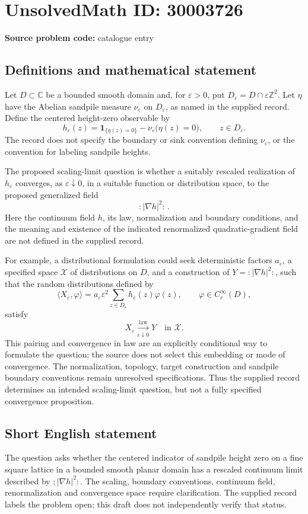 \documentclass[11pt]{article}
\newcommand{\Z}{\mathbb{Z}}
\newcommand{\C}{\mathbb{C}}
\begin{document}
\section*{UnsolvedMath ID: 30003726}
\textbf{Source problem code:} catalogue entry
\subsection{Definitions and mathematical statement}
Let \(D\subset\C\) be a bounded smooth domain and, for \(\varepsilon>0\), put \(D_\varepsilon=D\cap\varepsilon\Z^2\). Let \(\eta\) have the Abelian sandpile measure \(\nu_\varepsilon\) on \(D_\varepsilon\), as named in the supplied record. Define the centered height-zero observable by
\[
h_\varepsilon(z)=\mathbf{1}_{\{\eta(z)=0\}}-\nu_\varepsilon\bigl(\eta(z)=0\bigr),\qquad z\in D_\varepsilon.
\]
The record does not specify the boundary or sink convention defining \(\nu_\varepsilon\), or the convention for labeling sandpile heights.

The proposed scaling-limit question is whether a suitably rescaled realization of \(h_\varepsilon\) converges, as \(\varepsilon\downarrow0\), in a suitable function or distribution space, to the proposed generalized field
\[
:\!|\nabla h|^2\!:\,.
\]
Here the continuum field \(h\), its law, normalization and boundary conditions, and the meaning and existence of the indicated renormalized quadratic-gradient field are not defined in the supplied record.

For example, a distributional formulation could seek deterministic factors \(a_\varepsilon\), a specified space \(\mathcal X\) of distributions on \(D\), and a construction of \(Y=:\!|\nabla h|^2\!:\), such that the random distributions defined by
\[
\langle X_\varepsilon,\varphi\rangle
=a_\varepsilon\varepsilon^2\sum_{z\in D_\varepsilon}h_\varepsilon(z)\varphi(z),
\qquad \varphi\in C_c^\infty(D),
\]
satisfy
\[
X_\varepsilon\xrightarrow[\varepsilon\downarrow0]{\mathrm{law}}Y
\quad\text{in }\mathcal X.
\]
This pairing and convergence in law are an explicitly conditional way to formulate the question; the source does not select this embedding or mode of convergence. The normalization, topology, target construction and sandpile boundary conventions remain unresolved specifications. Thus the supplied record determines an intended scaling-limit question, but not a fully specified convergence proposition.
\subsection{Short English statement}
The question asks whether the centered indicator of sandpile height zero on a fine square lattice in a bounded smooth planar domain has a rescaled continuum limit described by \(:\!|\nabla h|^2\!:\). The scaling, boundary conventions, continuum field, renormalization and convergence space require clarification. The supplied record labels the problem open; this draft does not independently verify that status.
\end{document}
